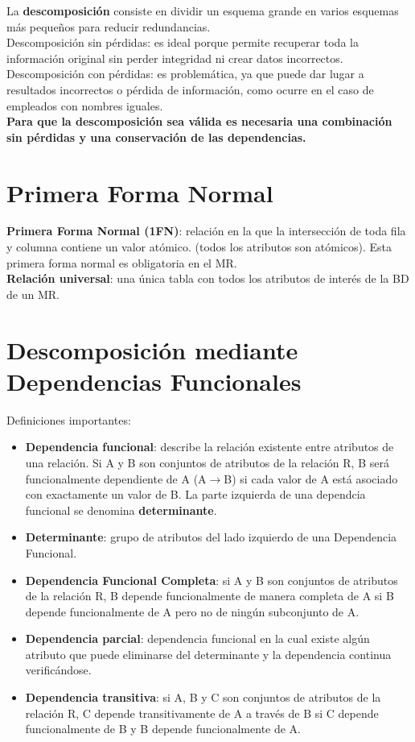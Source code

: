 \documentclass{article}
\begin{document}
La \textbf{descomposición} consiste en dividir un esquema grande en varios esquemas más pequeños para reducir redundancias. \\
Descomposición sin pérdidas: es ideal porque permite recuperar toda la información original sin perder integridad ni crear datos incorrectos. \\
Descomposición con pérdidas: es problemática, ya que puede dar lugar a resultados incorrectos o pérdida de información, como ocurre en el caso de empleados con nombres iguales. \\

\textbf{Para que la descomposición sea válida es necesaria una combinación sin pérdidas y una conservación de las dependencias.} \\

\section{Primera Forma Normal}
\textbf{Primera Forma Normal (1FN)}: relación en la que la intersección de toda fila y columna contiene un valor atómico. (todos los atributos son atómicos). Esta primera forma normal es obligatoria en el MR.\\
\textbf{Relación universal}: una única tabla con todos los atributos de interés de la BD de un MR.

\section{Descomposición mediante Dependencias Funcionales}
Definiciones importantes:
\begin{itemize}
    \item \textbf{Dependencia funcional}: describe la relación existente entre atributos de una relación. Si A y B son conjuntos de atributos de la relación R, B será funcionalmente dependiente de A (A$\xrightarrow{}$B) si cada valor de A está asociado con exactamente un valor de B. La parte izquierda de una dependcia funcional se denomina \textbf{determinante}.
    \item \textbf{Determinante}: grupo de atributos del lado izquierdo de una Dependencia Funcional.
    \item \textbf{Dependencia Funcional Completa}: si A y B son conjuntos de atributos de la relación R, B depende funcionalmente de manera completa de A si B depende funcionalmente de A pero no de ningún subconjunto de A.
    \item \textbf{Dependencia parcial}: dependencia funcional en la cual existe algún atributo que puede eliminarse del determinante y la dependencia continua verificándose.
    \item \textbf{Dependencia transitiva}: si A, B y C son conjuntos de atributos de la relación R, C depende transitivamente de A a través de B si C depende funcionalmente de B y B depende funcionalmente de A.
    
\end{itemize}
\end{document}
